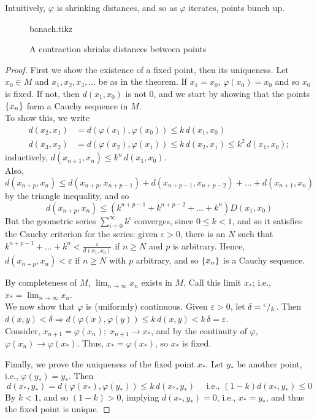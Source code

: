 \documentclass[../main-sheet.tex]{subfiles}
\begin{document}
Intuitively, $ \varphi $ is shrinking distances, and so as $ \varphi $ iterates, points bunch up.
\begin{figure}[H]
    \centering
    {banach.tikz}
    \caption{A contraction shrinks distances between points}
\end{figure}
\begin{proof}
    First we show the existence of a fixed point, then its uniqueness. Let $ x_0\in M $ and $ x_1,x_2,x_3,\dots  $ be as in the theorem. If $ x_1=x_0 $, $ \varphi(x_0)=x_0 $ and so $ x_0 $ is fixed. If not, then $ d(x_1,x_0) $ is not $ 0 $, and we start by showing that the points $ \left\{x_n\right\} $ form a Cauchy sequence in $ M $.\\
    To show this, we write 
    \begin{align*}
        d(x_2,x_1) &=d\left( \varphi(x_1),\varphi(x_0) \right)\leq k\, d(x_1,x_0)\\
        d(x_3,x_2) &=d\left( \varphi(x_2),\varphi(x_1) \right)\leq k\, d(x_2,x_1)\leq k^2\, d(x_1,x_0);
    \end{align*}
    inductively, $ d(x_{n+1},x_n) \leq k^n\, d(x_1,x_0)$.\\
    Also,
    \[
        d\left( x_{n+p},x_n \right)\leq d\left( x_{n+p},x_{n+p-1} \right)+d\left( x_{n+p-1},x_{n+p-2} \right)+\dots+d\left( x_{n+1},x_n \right)
    \]
    by the triangle inequality, and so
    \[
        d\left( x_{n+p},x_n \right)\leq \left( k^{n+p-1}+k^{n+p-2}+\dots+k^n \right)D(x_1,x_0)
    \]
    But the geometric series $ \sum_{i=0}^\infty k^i $ converges, since $ 0\leq k<1 $, and so it satisfies the Cauchy criterion for the series: given $ \varepsilon>0 $, there is an $ N $ such that $ k^{n+p-1}+\dots+k^n<\frac{\varepsilon}{d(x_1,x_0)} $ if $ n\geq N $ and $ p $ is arbitrary. Hence, $  d\left( x_{n+p},x_n \right)<\varepsilon $ if $ n\geq N $ with $ p $ arbitrary, and so $ \left\{x_n\right\} $ is a Cauchy sequence.

    By completeness of $ M $, $ \lim_{n\to\infty}x_n $ exists in $ M $. Call this limit $ x_* $; i.e., $ x_*=\lim_{n\to\infty} x_n $.\\
    We now show that $ \varphi $ is (uniformly) continuous. Given $ \varepsilon>0 $, let $ \delta={}^{\epsilon}/{}_{k} $. Then $ d(x,y)<\delta\Rightarrow d(\varphi(x),\varphi(y))\leq k\, d(x,y)< k\,\delta=\varepsilon$.\\
    Consider, $ x_{n+1}=\varphi(x_n);\;x_{n+1}\to x_* $, and by the continuity of $ \varphi $, $ \varphi(x_n)\to\varphi(x_*) $. Thus, $ x_*=\varphi(x_*) $, so $ x_* $ is fixed.

    Finally, we prove the uniqueness of the fixed point $ x_* $. Let $ y_* $ be another point, i.e., $ \varphi(y_*)=y_* $. Then
    \[
        d\left(x_*,y_*\right)=d\left( \varphi(x_*),\varphi(y_*) \right)\leq k\,d\left( x_*,y_* \right)\quad \text{ i.e., } (1-k) d\left( x_*,y_* \right)\leq 0
    \]
    By $ k<1 $, and so $ (1-k)>0 $, implying $ d(x_*,y_*)=0 $, i.e., $ x_*=y_* $, and thus the fixed point is unique.
\end{proof}
\end{document}
